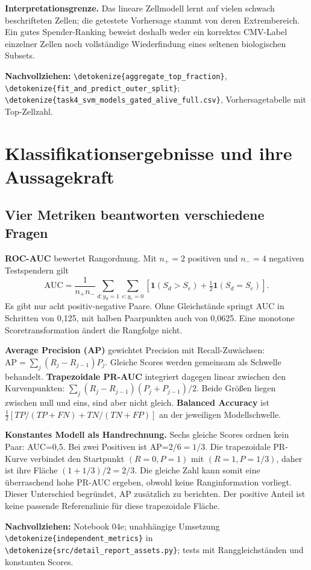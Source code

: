 \documentclass[11pt,a4paper]{article}
\newcommand{\code}[1]{\expandafter\nolinkurl\expandafter{\detokenize{#1}}}
\newcommand{\source}[1]{\par{\footnotesize\raggedright\color{muted}\textbf{Nachvollziehen:} #1\par}}
\newcommand{\tab}[4]{\begin{table}[!ht]\centering\caption{#2}\label{#3}{\small}#4\end{table}}
\begin{document}
\textbf{Interpretationsgrenze.} Das lineare Zellmodell lernt auf vielen
schwach beschrifteten Zellen; die getestete Vorhersage stammt von deren
Extrembereich. Ein gutes Spender-Ranking beweist deshalb weder ein korrektes
CMV-Label einzelner Zellen noch vollständige Wiederfindung eines seltenen
biologischen Subsets.
\source{\code{aggregate_top_fraction}, \code{fit_and_predict_outer_split};
\code{task4_svm_models_gated_alive_full.csv}, Vorhersagetabelle mit Top-Zellzahl.}

\clearpage
\section{Klassifikationsergebnisse und ihre Aussagekraft}\label{sec:ergebnisse}
\subsection*{Vier Metriken beantworten verschiedene Fragen}
\textbf{ROC-AUC} bewertet Rangordnung. Mit \(n_+=2\) positiven und
\(n_-=4\) negativen Testspendern gilt
\[
 \mathrm{AUC}=\frac1{n_+n_-}\sum_{d:y_d=1}\sum_{e:y_e=0}
 \left[\mathbf1(S_d>S_e)+\tfrac12\mathbf1(S_d=S_e)\right].
\]
Es gibt nur acht positiv-negative Paare. Ohne Gleichstände springt AUC in
Schritten von 0,125, mit halben Paarpunkten auch von 0,0625. Eine monotone
Scoretransformation ändert die Rangfolge nicht.

\textbf{Average Precision (AP)} gewichtet Precision mit Recall-Zuwächsen:
\(\mathrm{AP}=\sum_j(R_j-R_{j-1})P_j\). Gleiche Scores werden gemeinsam
als Schwelle behandelt. \textbf{Trapezoidale PR-AUC} integriert dagegen
linear zwischen den Kurvenpunkten:
\(\sum_j(R_j-R_{j-1})(P_j+P_{j-1})/2\).
Beide Größen liegen zwischen null und eins, sind aber nicht gleich.
\textbf{Balanced Accuracy} ist
\(\tfrac12[TP/(TP+FN)+TN/(TN+FP)]\) an der jeweiligen Modellschwelle.

\tab{metriken}{Vollständige Metrikübersicht über 100 gemeinsame äußere
Splits. Q1/Q3 sind Quartile, SD die Stichprobenstandardabweichung über
Splits. Die 1.200 Einzelwerte und ihre Zusammenfassungen wurden für den
Bericht unabhängig nachgerechnet.}{tab:metrics}{}

\textbf{Konstantes Modell als Handrechnung.} Sechs gleiche Scores ordnen
kein Paar: AUC=0,5. Bei zwei Positiven ist AP=\(2/6=1/3\).
Die trapezoidale PR-Kurve verbindet den Startpunkt \((R=0,P=1)\) mit
\((R=1,P=1/3)\), daher ist ihre Fläche \((1+1/3)/2=2/3\).
Die gleiche Zahl kann somit eine überraschend hohe PR-AUC ergeben, obwohl
keine Ranginformation vorliegt. Dieser Unterschied begründet, AP zusätzlich
zu berichten. Der positive Anteil ist keine passende Referenzlinie für
diese trapezoidale Fläche.
\source{Notebook 04e; unabhängige Umsetzung \code{independent_metrics}
in \code{src/detail_report_assets.py}; tests mit Ranggleichständen und
konstanten Scores.}
\end{document}
